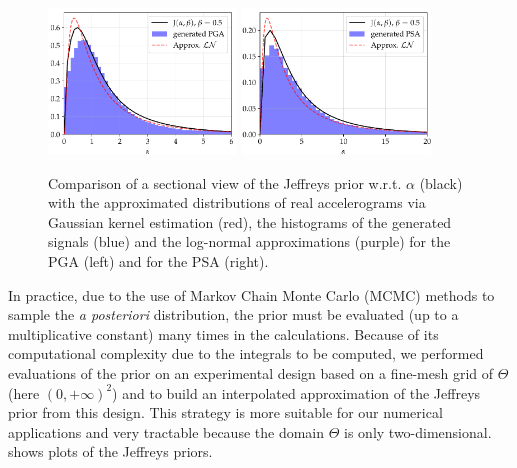        \begin{figure}[!ht]
        \centering
        {\includegraphics[width=5cm]{figures/PREM/PGAjeff.pdf}}
        {\includegraphics[width=5cm]{figures/PREM/PSAjeff.pdf}}        
        \caption{Comparison of a sectional view of the Jeffreys prior w.r.t. $\alpha$ (black) with the approximated distributions of real accelerograms via Gaussian kernel estimation (red), the histograms of the generated signals (blue) and the log-normal approximations (purple) for the PGA (left) and for the PSA (right).}
         \label{uncIM:fig:IM}
    \end{figure}

        In practice, due to the use of Markov Chain Monte Carlo (MCMC) methods to sample the \emph{a posteriori} distribution, the prior must be evaluated (up to a multiplicative constant) many times in the calculations. Because of its computational complexity due to the integrals to be computed, we performed evaluations of the prior on an experimental design based on a fine-mesh grid of $\Theta$ (here $(0,+\infty)^2$) and to build an interpolated approximation of the Jeffreys prior from this design. This strategy is more suitable for our numerical applications and very tractable because the domain $\Theta$ is only two-dimensional.  shows plots of the Jeffreys priors. 
        
